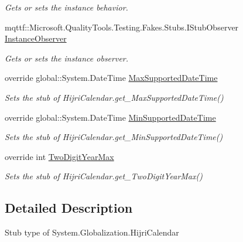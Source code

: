 \begin{DoxyCompactItemize}
\begin{DoxyCompactList}\small\item\em Gets or sets the instance behavior.\end{DoxyCompactList}\item 
mqttf\-::\-Microsoft.\-Quality\-Tools.\-Testing.\-Fakes.\-Stubs.\-I\-Stub\-Observer \hyperlink{class_system_1_1_globalization_1_1_fakes_1_1_stub_hijri_calendar_a2c226c48a9b1f060f11f168334775f19}{Instance\-Observer}
\begin{DoxyCompactList}\small\item\em Gets or sets the instance observer.\end{DoxyCompactList}\item 
override global\-::\-System.\-Date\-Time \hyperlink{class_system_1_1_globalization_1_1_fakes_1_1_stub_hijri_calendar_aabc75d2939465623b6f738a824891f11}{Max\-Supported\-Date\-Time}
\begin{DoxyCompactList}\small\item\em Sets the stub of Hijri\-Calendar.\-get\-\_\-\-Max\-Supported\-Date\-Time()\end{DoxyCompactList}\item 
override global\-::\-System.\-Date\-Time \hyperlink{class_system_1_1_globalization_1_1_fakes_1_1_stub_hijri_calendar_a00b008527d9cc98e5d9318c603c91725}{Min\-Supported\-Date\-Time}
\begin{DoxyCompactList}\small\item\em Sets the stub of Hijri\-Calendar.\-get\-\_\-\-Min\-Supported\-Date\-Time()\end{DoxyCompactList}\item 
override int \hyperlink{class_system_1_1_globalization_1_1_fakes_1_1_stub_hijri_calendar_abc56824fe0276e40a858128186b6e780}{Two\-Digit\-Year\-Max}
\begin{DoxyCompactList}\small\item\em Sets the stub of Hijri\-Calendar.\-get\-\_\-\-Two\-Digit\-Year\-Max()\end{DoxyCompactList}\end{DoxyCompactItemize}


\subsection{Detailed Description}
Stub type of System.\-Globalization.\-Hijri\-Calendar



